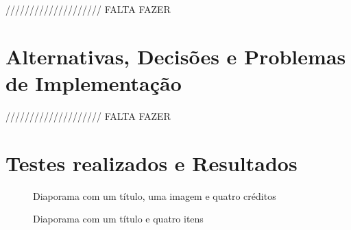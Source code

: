 \documentclass[11pt,a4paper]{report}
\begin{document}
//////////////////// FALTA FAZER

\section{Alternativas, Decisões e Problemas de Implementação}

//////////////////// FALTA FAZER

\section{Testes realizados e Resultados}

\begin{figure}[H]
\centering
{}
\caption{Diaporama com um título, uma imagem e quatro créditos}
\label{img:exemplo1}
\end{figure}

\begin{figure}[H]
\centering
{}
\caption{Diaporama com um título e quatro itens}
\label{img:exemplo3}
\end{figure}
\end{document}
